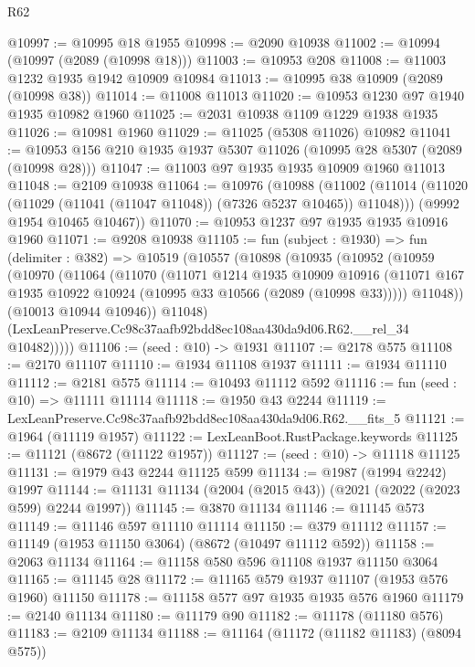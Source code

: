 \begin{lexlean}{R62}
\begin{coremodule}
@10997 := @10995 @18 @1955
@10998 := @2090 @10938
@11002 := @10994 (@10997 (@2089 (@10998 @18)))
@11003 := @10953 @208
@11008 := @11003 @1232 @1935 @1942 @10909 @10984
@11013 := @10995 @38 @10909 (@2089 (@10998 @38))
@11014 := @11008 @11013
@11020 := @10953 @1230 @97 @1940 @1935 @10982 @1960
@11025 := @2031 @10938 @1109 @1229 @1938 @1935
@11026 := @10981 @1960
@11029 := @11025 (@5308 @11026) @10982
@11041 := @10953 @156 @210 @1935 @1937 @5307 @11026 (@10995 @28 @5307 (@2089 (@10998 @28)))
@11047 := @11003 @97 @1935 @1935 @10909 @1960 @11013
@11048 := @2109 @10938
@11064 := @10976
    (@10988
      (@11002 (@11014 (@11020 (@11029 (@11041 (@11047 @11048)) (@7326 @5237 @10465)) @11048)))
      (@9992 @1954 @10465 @10467))
@11070 := @10953 @1237 @97 @1935 @1935 @10916 @1960
@11071 := @9208 @10938
@11105 := fun (subject : @1930) =>
  fun (delimiter : @382) =>
  @10519
    (@10557
      (@10898
        (@10935
          (@10952
            (@10959
              (@10970
                (@11064
                  (@11070
                    (@11071
                      @1214
                      @1935
                      @10909
                      @10916
                      (@11071 @167 @1935 @10922 @10924 (@10995 @33 @10566 (@2089 (@10998 @33)))))
                    @11048))
                (@10013 @10944 @10946))
              @11048)
            (LexLeanPreserve.Cc98c37aafb92bdd8ec108aa430da9d06.R62.__rel_34 @10482)))))
@11106 := (seed : @10) -> @1931
@11107 := @2178 @575
@11108 := @2170 @11107
@11110 := @1934 @11108 @1937
@11111 := @1934 @11110
@11112 := @2181 @575
@11114 := @10493 @11112 @592
@11116 := fun (seed : @10) => @11111 @11114
@11118 := @1950 @43 @2244
@11119 := LexLeanPreserve.Cc98c37aafb92bdd8ec108aa430da9d06.R62.__fits_5
@11121 := @1964 (@11119 @1957)
@11122 := LexLeanBoot.RustPackage.keywords
@11125 := @11121 (@8672 (@11122 @1957))
@11127 := (seed : @10) -> @11118 @11125
@11131 := @1979 @43 @2244 @11125 @599
@11134 := @1987 (@1994 @2242) @1997
@11144 := @11131 @11134 (@2004 (@2015 @43)) (@2021 (@2022 (@2023 @599) @2244 @1997))
@11145 := @3870 @11134
@11146 := @11145 @573
@11149 := @11146 @597 @11110 @11114
@11150 := @379 @11112
@11157 := @11149 (@1953 @11150 @3064) (@8672 (@10497 @11112 @592))
@11158 := @2063 @11134
@11164 := @11158 @580 @596 @11108 @1937 @11150 @3064
@11165 := @11145 @28
@11172 := @11165 @579 @1937 @11107 (@1953 @576 @1960) @11150
@11178 := @11158 @577 @97 @1935 @1935 @576 @1960
@11179 := @2140 @11134
@11180 := @11179 @90
@11182 := @11178 (@11180 @576)
@11183 := @2109 @11134
@11188 := @11164 (@11172 (@11182 @11183) (@8094 @575))

\end{coremodule}
\end{lexlean}
